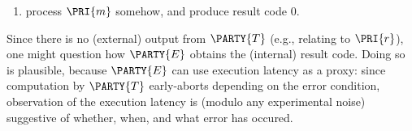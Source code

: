 \begin{enumerate}
\begin{itemize}
            \noindent
            
      \end{itemize}

\item process $\PRI{m}$ somehow,
                               and produce   result code $0$.          
\end{enumerate}

\noindent
Since there is no (external) output from
$\PARTY{T}$
(e.g., relating to $\PRI{r}$), 
one might question how
$\PARTY{E}$
obtains the (internal) result code.  Doing so is plausible, because 
$\PARTY{E}$
can use execution latency as a proxy: since computation by
$\PARTY{T}$
early-aborts depending on the error condition, observation of the execution
latency is (modulo any experimental noise) suggestive of whether, when, and 
what error has occured.




%


